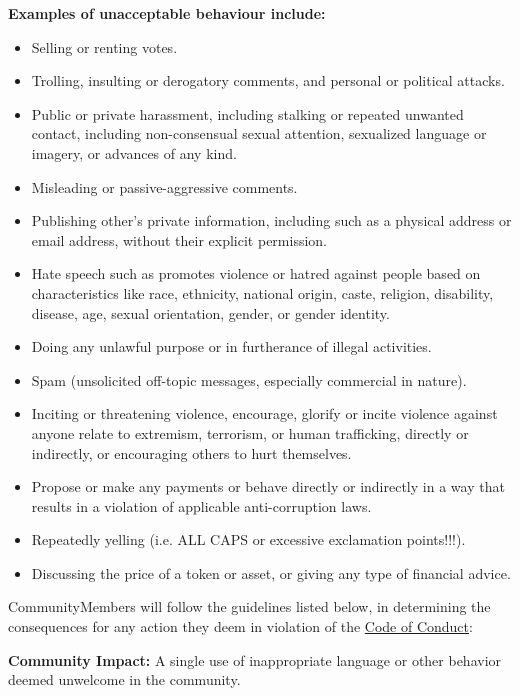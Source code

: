 \textbf{Examples of unacceptable behaviour include:}
\begin{itemize}
	\item Selling or renting votes.
	\item Trolling, insulting or derogatory comments, and personal or political attacks.
	\item Public or private harassment, including stalking or repeated unwanted contact, including non-consensual sexual attention, sexualized language or imagery, or advances of any kind.
	\item Misleading or passive-aggressive comments.
	\item Publishing other's private information, including such as a physical address or email address, without their explicit permission.
	\item Hate speech such as promotes violence or hatred against people based on characteristics like race, ethnicity, national origin, caste, religion, disability, disease, age, sexual orientation, gender, or gender identity.
	\item Doing any unlawful purpose or in furtherance of illegal activities.
	\item Spam (unsolicited off-topic messages, especially commercial in nature).
	\item Inciting or threatening violence, encourage, glorify or incite violence against anyone relate to extremism, terrorism, or human trafficking, directly or indirectly, or encouraging others to hurt themselves.
	\item Propose or make any payments or behave directly or indirectly in a way that results in a violation of applicable anti-corruption laws.
	\item Repeatedly yelling (i.e. ALL CAPS or excessive exclamation points!!!).
	\item Discussing the price of a token or asset, or giving any type of financial advice.
\end{itemize}


\label{sec:ViolationsAndConsequences}
	
\glspl{CommunityMember} will follow the guidelines listed below, in determining the consequences for any action they deem in violation of the \hyperref[sec:CodeOfConduct]{Code of Conduct}:


	\textbf{Community Impact:} A single use of inappropriate language or other behavior deemed unwelcome in the community.
	
